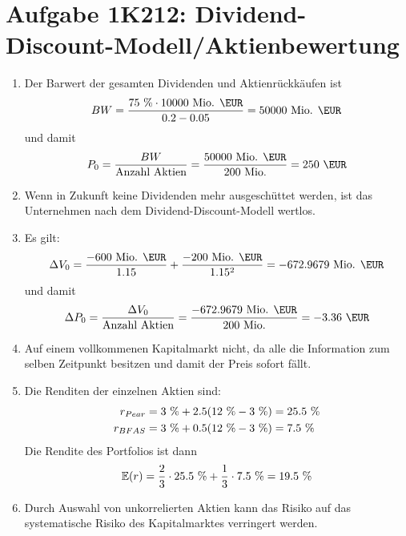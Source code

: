 \documentclass{article}
\newcommand{\E}{\mathbb{E}}
\begin{document}
	\section*{Aufgabe 1K212: Dividend-Discount-Modell/Aktienbewertung}
	\begin{enumerate}[label=(\alph*)]
		\item Der Barwert der gesamten Dividenden und Aktienrückkäufen ist
		\begin{align}
			BW = \frac{75\text{ \%}\cdot 10000\text{ Mio. \EUR}}{0.2-0.05} = 50000\text{ Mio. \EUR} \notag
		\end{align}
		und damit
		\begin{align}
			P_0 = \frac{BW}{\text{Anzahl Aktien}} = \frac{50000\text{ Mio. \EUR}}{200\text{ Mio.}} = 250\text{ \EUR} \notag
		\end{align}
		\item Wenn in Zukunft keine Dividenden mehr ausgeschüttet werden, ist das Unternehmen nach dem Dividend-Discount-Modell wertlos.
		\item Es gilt:
		\begin{align}
			\Delta V_0 = \frac{-600\text{ Mio. \EUR}}{1.15} + \frac{-200\text{ Mio. \EUR}}{1.15^2} = -672.9679\text{ Mio. \EUR} \notag
		\end{align}
		und damit
		\begin{align}
			\Delta P_0 = \frac{\Delta V_0}{\text{Anzahl Aktien}} = \frac{-672.9679\text{ Mio. \EUR}}{200\text{ Mio.}} = -3.36\text{ \EUR} \notag
		\end{align}
		\item Auf einem vollkommenen Kapitalmarkt nicht, da alle die Information zum selben Zeitpunkt besitzen und damit der Preis sofort fällt.
		\item Die Renditen der einzelnen Aktien sind:
		\begin{align}
			r_{Pear} &= 3\text{ \%}+2.5(12\text{ \%}-3\text{ \%}) = 25.5\text{ \%} \notag \\
			r_{BFAS} &= 3\text{ \%}+0.5(12\text{ \%}-3\text{ \%}) = 7.5\text{ \%} \notag
		\end{align}
		Die Rendite des Portfolios ist dann
		\begin{align}
			\E(r) = \frac{2}{3}\cdot 25.5\text{ \%} + \frac{1}{3}\cdot 7.5\text{ \%} = 19.5\text{ \%} \notag
		\end{align}
		\item Durch Auswahl von unkorrelierten Aktien kann das Risiko auf das systematische Risiko des Kapitalmarktes verringert werden.
	\end{enumerate}
	
\end{document}
